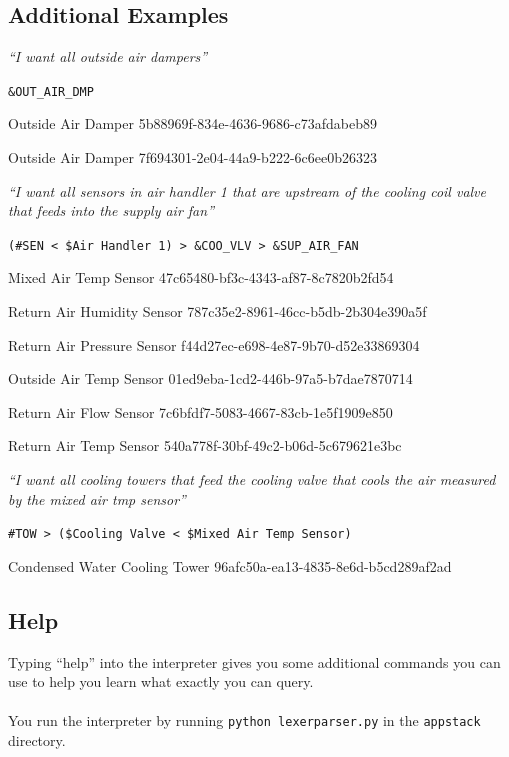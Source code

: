\documentclass{article}
\begin{document}
\subsection{Additional Examples} %
\label{sub:additional_examples}

\begin{center}\emph{``I want all outside air dampers''}
	
	\verb+&OUT_AIR_DMP+
	
	Outside Air Damper 5b88969f-834e-4636-9686-c73afdabeb89
	
	Outside Air Damper 7f694301-2e04-44a9-b222-6c6ee0b26323
\end{center}

\begin{center}\emph{``I want all sensors in air handler 1 that are upstream of the cooling coil valve that feeds into the supply air fan''}
	
	\verb+(#SEN < $Air Handler 1) > &COO_VLV > &SUP_AIR_FAN+
	
	Mixed Air Temp Sensor 47c65480-bf3c-4343-af87-8c7820b2fd54
	
	Return Air Humidity Sensor 787c35e2-8961-46cc-b5db-2b304e390a5f
	
	Return Air Pressure Sensor f44d27ec-e698-4e87-9b70-d52e33869304
	
	Outside Air Temp Sensor 01ed9eba-1cd2-446b-97a5-b7dae7870714
	
	Return Air Flow Sensor 7c6bfdf7-5083-4667-83cb-1e5f1909e850

	Return Air Temp Sensor 540a778f-30bf-49c2-b06d-5c679621e3bc
\end{center}

\begin{center}\emph{``I want all cooling towers that feed the cooling valve that cools the air measured by the mixed air tmp sensor''}
	
	\verb+#TOW > ($Cooling Valve < $Mixed Air Temp Sensor)+
	
	Condensed Water Cooling Tower 96afc50a-ea13-4835-8e6d-b5cd289af2ad
\end{center}

\subsection{Help} %
\label{sub:help}
Typing ``help'' into the interpreter gives you some additional commands you can use to help you learn what exactly you can query.
\\\\
You run the interpreter by running \verb+python lexerparser.py+ in the \verb+appstack+ directory.
\end{document}
